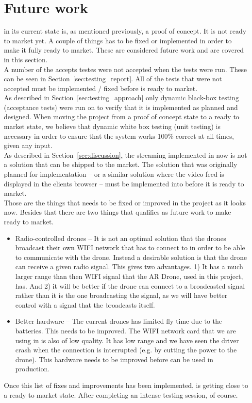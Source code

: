 
\section{Future work}

\projectname{} in its current state is, as mentioned previously, a proof of concept.
It is not ready to market yet. 
A couple of things has to be fixed or implemented in order to make it fully ready to market. 
These are considered future work and are covered in this section. \\

A number of the accepts testes were not accepted when the tests were run.
These can be seen in Section~\ref{sec:testing_report}.
All of the tests that were not accepted must be implemented / fixed before \projectname{} is ready to market. \\

As described in Section~\ref{sec:testing_approach} only dynamic black-box testing (acceptance tests) were run on \projectname{} to verify that it is implemented as planned and designed.
When moving the project from a proof of concept state to a ready to market state, we believe that dynamic white box testing (unit testing) is necessary in order to ensure that the system works 100\% correct at all times, given any input. \\

As described in Section~\ref{sec:discussion}, the streaming implemented in \projectname{} now is not a solution that can be shipped to the market. 
The solution that was originally planned for implementation -- or a similar solution where the video feed is displayed in the clients browser -- must be implemented into \projectname{} before it is ready to market. \\

Those are the things that needs to be fixed or improved in the project as it looks now.
Besides that there are two things that qualifies as future work to make \projectname{} ready to market. 

\begin{itemize}
	\item Radio-controlled drones -- It is not an optimal solution that the drones broadcast their own WIFI network that  has to connect to in order to be able to communicate with the drone. Instead a desirable solution is that the drone can receive a given radio signal. This gives two advantages. 1) It has a much larger range than then WIFI signal that the AR Drone, used in this project, has. And 2) it will be better if the drone can connect to a broadcasted signal rather than it is the one broadcasting the signal, as we will have better control with a signal that the  broadcasts itself. 
	\item Better hardware -- The current drones has limited fly time due to the batteries. This needs to be improved. The WIFI network card that we are using in  is also of low quality. It has low range and we have seen the driver crash when the connection is interrupted (e.g. by cutting the power to the drone). This hardware needs to be improved before \projectname{} can be used in production. 
\end{itemize}

Once this list of fixes and improvements has been implemented, \projectname{} is getting close to a ready to market state. After completing an intense testing session, of course. 
